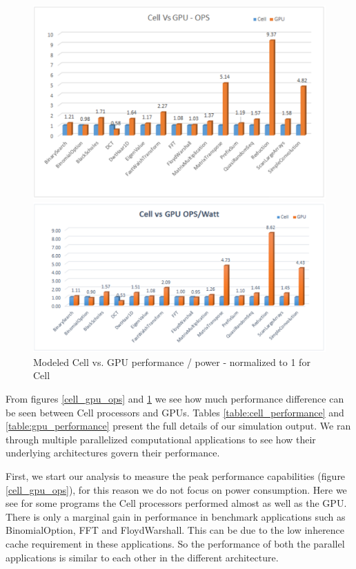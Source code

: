 \documentclass{sig-alternate-05-2015}
\begin{document}
\begin{figure}
\centering
\includegraphics[scale=0.8]{./cell_gpu_ops}
\caption{Modeled Cell vs. GPU performance - normalized to 1 for Cell}
\label{cell_gpu_ops}

\centering
\includegraphics[scale=0.8]{./cell_gpu_opsperwatt}
\caption{Modeled Cell vs. GPU performance / power - normalized to 1 for Cell}
\label{cell_gpu_opsperwatt}
\end{figure}


From figures \ref{cell_gpu_ops} and \ref{cell_gpu_opsperwatt} we see how much performance difference can be seen between Cell processors and GPUs. Tables \ref{table:cell_performance} and \ref{table:gpu_performance} present the full details of our simulation output. We ran through multiple parallelized computational applications to see how their underlying architectures govern their performance. 

First, we start our analysis to measure the peak performance capabilities (figure \ref{cell_gpu_ops}), for this reason we do not focus on power consumption.  Here we see for some programs the Cell processors performed almost as well as the GPU. There is only a marginal gain in performance in benchmark applications such as BinomialOption, FFT and FloydWarshall. This can be due to the low inherence cache requirement in these applications. So the performance of both the parallel applications is similar to each other in the different architecture. 
\end{document}
